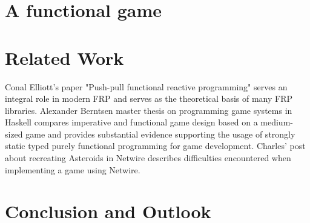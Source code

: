 \documentclass{article}
\begin{document}
\section{A functional game}
\label{sec:game}

\section{Related Work}
\label{sec:related}
Conal Elliott's paper "Push-pull functional reactive programming" \cite{Elliott2009-push-pull-frp} serves an integral role in modern FRP
and serves as the theoretical basis of many FRP libraries. Alexander Berntsen master thesis on programming game systems in Haskell \cite{Berntsen2014-game-systems-haskell} compares imperative and functional game design based on a medium-sized game and provides substantial evidence supporting the usage of strongly static typed purely functional programming for game development. Charles' post about recreating Asteroids in Netwire \cite{asteroids} describes difficulties encountered when implementing a game using Netwire.
\section{Conclusion and Outlook}
\label{sec:conclusion}



\end{document}
